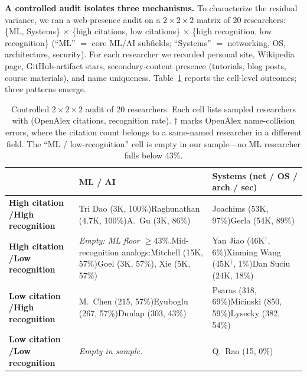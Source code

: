 \documentclass[11pt]{article}
\begin{document}
\textbf{A controlled audit isolates three mechanisms.} To characterize the residual variance, we ran a web-presence audit on a $2\times2\times2$ matrix of 20 researchers: \{ML, Systems\} $\times$ \{high citations, low citations\} $\times$ \{high recognition, low recognition\} (``ML'' $=$ core ML/AI subfields; ``Systems'' $=$ networking, OS, architecture, security). For each researcher we recorded personal site, Wikipedia page, GitHub-artifact stars, secondary-content presence (tutorials, blog posts, course materials), and name uniqueness. Table~\ref{tab:8cell} reports the cell-level outcomes; three patterns emerge.

\begin{table}[H]
\centering
\small
\caption{Controlled $2\times2\times2$ audit of 20 researchers. Each cell lists sampled researchers with (OpenAlex citations, recognition rate). $\dagger$ marks OpenAlex name-collision errors, where the citation count belongs to a same-named researcher in a different field. The ``ML / low-recognition'' cell is empty in our sample---no ML researcher falls below 43\%.}
\label{tab:8cell}
\renewcommand{\arraystretch}{1.15}
\begin{tabular}{p{3.2cm}|p{5.1cm}|p{5.1cm}}
\toprule
 & \textbf{ML / AI} & \textbf{Systems (net / OS / arch / sec)} \\
\midrule
\textbf{High citation /\newline High recognition} & Tri Dao (3K, 100\%)\newline Raghunathan (4.7K, 100\%)\newline A.\ Gu (3K, 86\%) & Joachims (53K, 97\%)\newline Gerla (54K, 89\%) \\
\midrule
\textbf{High citation /\newline Low recognition}  & \emph{Empty: ML floor $\geq 43\%$.}\newline Mid-recognition analogs:\newline Mitchell (15K, 57\%)\newline Goel (3K, 57\%), Xie (5K, 57\%) & Yan Jiao (46K$^\dagger$, 6\%)\newline Xinming Wang (45K$^\dagger$, 1\%)\newline Dan Suciu (24K, 18\%) \\
\midrule
\textbf{Low citation /\newline High recognition}  & M.\ Chen (215, 57\%)\newline Eyuboglu (267, 57\%)\newline Dunlap (303, 43\%) & Psaras (318, 69\%)\newline Micinski (850, 59\%)\newline Lysecky (382, 54\%) \\
\midrule
\textbf{Low citation /\newline Low recognition}   & \emph{Empty in sample.} & Q.\ Rao (15, 0\%) \\
\bottomrule
\end{tabular}
\end{table}
\end{document}
